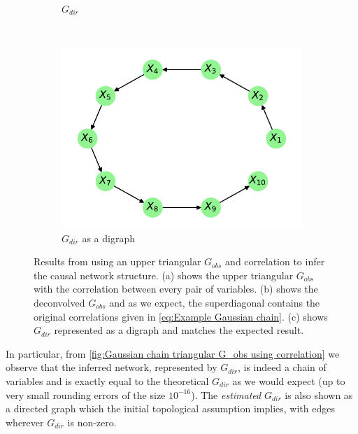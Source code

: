\documentclass[../Thesis.tex]{subfiles}
\begin{document}
\begin{figure}[ht]
\begin{subfigure}[t]{0.49\textwidth}
        \caption{$G_{dir}$}
        \label{subfig:Gaussian chain triangular G_obs using correlation - G_dir}
    \end{subfigure}
    \\[\baselineskip]
    \begin{subfigure}[t]{0.49\textwidth}
        \centering
        \includegraphics[width=.9\linewidth]{figures/Gaussian Chain Theoretical/Chain graph from triangular G obs.pdf}
        \caption{$G_{dir}$ as a digraph}
    \end{subfigure}
    \caption{Results from using an upper triangular $G_{obs}$ and correlation to infer the causal network structure. (a) shows the upper triangular $G_{obs}$ with the correlation between every pair of variables. (b) shows the deconvolved $G_{obs}$ and as we expect, the superdiagonal contains the original correlations given in \autoref{eq:Example Gaussian chain}. (c) shows $G_{dir}$ represented as a digraph and matches the expected result.}
    \label{fig:Gaussian chain triangular G_obs using correlation}
\end{figure}
In particular, from \autoref{fig:Gaussian chain triangular G_obs using correlation} we observe that the inferred network, represented by $G_{dir}$, is indeed a chain of variables and is exactly equal to the theoretical $G_{dir}$ as we would expect (up to very small rounding errors of the size $10^{-16}$). The \textit{estimated} $G_{dir}$ is also shown as a directed graph which the initial topological assumption implies, with edges wherever $G_{dir}$ is non-zero.
\end{document}
